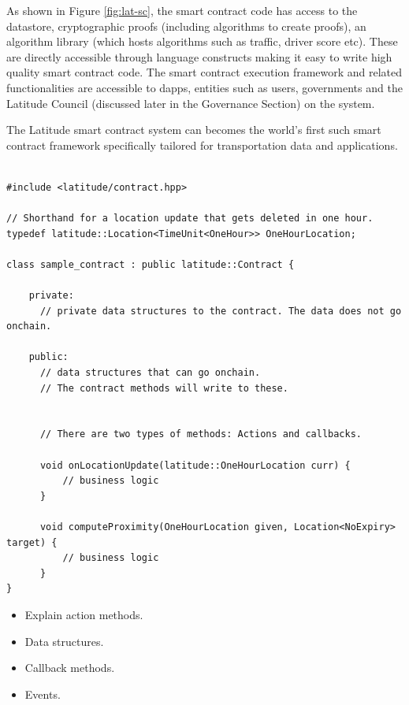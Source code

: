 As shown in Figure \ref{fig:lat-sc}, the smart contract code has access to the datastore, cryptographic proofs
(including algorithms to create proofs), an algorithm library (which hosts algorithms such as traffic, driver score
etc). These are directly accessible through language constructs making it easy to write high quality smart contract
code. The smart contract execution framework and related functionalities are accessible to dapps, entities such as
users, governments and the Latitude Council (discussed later in the Governance Section) on the system. 

The Latitude smart contract system can becomes the world's first such smart contract framework specifically tailored for
transportation data and applications.

\lstset{language=C++,basicstyle=\small}

\begin{lstlisting}[float, caption=Structure of a Latitude Smart Contract, frame=lines]

#include <latitude/contract.hpp>

// Shorthand for a location update that gets deleted in one hour.
typedef latitude::Location<TimeUnit<OneHour>> OneHourLocation;

class sample_contract : public latitude::Contract {

    private:
      // private data structures to the contract. The data does not go onchain.

    public:
      // data structures that can go onchain.
      // The contract methods will write to these.


      // There are two types of methods: Actions and callbacks.

      void onLocationUpdate(latitude::OneHourLocation curr) {
          // business logic
      }

      void computeProximity(OneHourLocation given, Location<NoExpiry> target) {
          // business logic
      }
}
\end{lstlisting}

\begin{itemize}

    \item Explain action methods.
    \item Data structures.
    \item Callback methods.
    \item Events.

\end{itemize}

